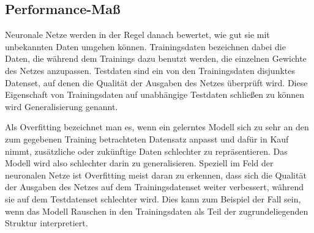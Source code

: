 


\subsection{Performance-Maß}

Neuronale Netze werden in der Regel danach bewertet, wie gut sie mit unbekannten Daten umgehen können.
Trainingsdaten bezeichnen dabei die Daten, die während dem Trainings dazu benutzt werden, die einzelnen Gewichte des Netzes anzupassen.
Testdaten sind ein von den Trainingsdaten disjunktes Datenset, auf denen die Qualität der Ausgaben des Netzes überprüft wird.
Diese Eigenschaft von Trainingsdaten auf unabhängige Testdaten schließen zu können wird Generalisierung genannt. 

Als Overfitting bezeichnet man es, wenn ein gelerntes Modell sich zu sehr an den zum gegebenen Training betrachteten Datensatz anpasst und 
dafür in Kauf nimmt, zusätzliche oder zukünftige Daten schlechter zu repräsentieren.
Das Modell wird also schlechter darin zu generalisieren.
Speziell im Feld der neuronalen Netze ist Overfitting meist daran zu erkennen,
dass sich die Qualität der Ausgaben des Netzes auf dem Trainingsdatenset weiter verbessert,
während sie auf dem Testdatenset schlechter wird.
Dies kann zum Beispiel der Fall sein, wenn das Modell Rauschen in den Trainingsdaten als Teil der zugrundeliegenden Struktur interpretiert. 


